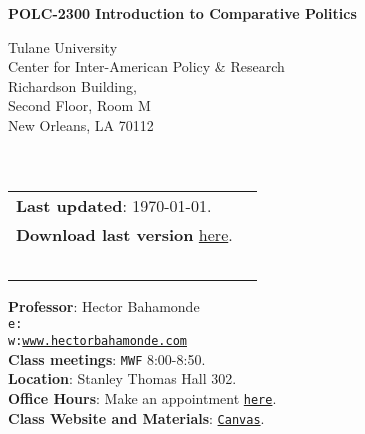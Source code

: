 \documentclass[letterpaper]{article}
\def\name{POLC-2300 Introduction to Comparative Politics}
\begin{document}

\centerline{\huge \bf \name}

\vspace{0.25in}

\begin{minipage}{0.45\linewidth}
  Tulane University \\
  Center for Inter-American Policy \& Research \\
  Richardson Building, \\
  Second Floor, Room M \\
  New Orleans, LA 70112\\
  \\
  \\

\end{minipage}
\hspace{4cm}\begin{minipage}{0.45\linewidth}
  \begin{tabular}{ll}
{\bf Last updated}: \today. \\
 {\bf Download last version} \href{https://github.com/hbahamonde/Comparative_Politics_UGRAD/raw/master/Bahamonde_Comparative_Politics_Syllabus_UGRAD.pdf}{here}.\\
    \\
    \\
    \\
    \\
    \\
  \end{tabular}
\end{minipage}

\vspace{-5mm}
{\bf Professor}: Hector Bahamonde\\
\texttt{e:}\href{mailto:\filetext}{\texttt{\filetext}}\\
\texttt{w:}\href{http://www.hectorbahamonde.com}{\texttt{www.hectorbahamonde.com}}\\
{\bf Class meetings}: \texttt{MWF} 8:00-8:50.\\
{\bf Location}: Stanley Thomas Hall 302.\\
{\bf Office Hours}: Make an appointment \href{https://calendly.com/bahamonde/officehours}{\texttt{here}}.\\
{\bf Class Website and Materials}: \href{https://tulane.instructure.com/courses/2170180}{\texttt{Canvas}}.
\end{document}
